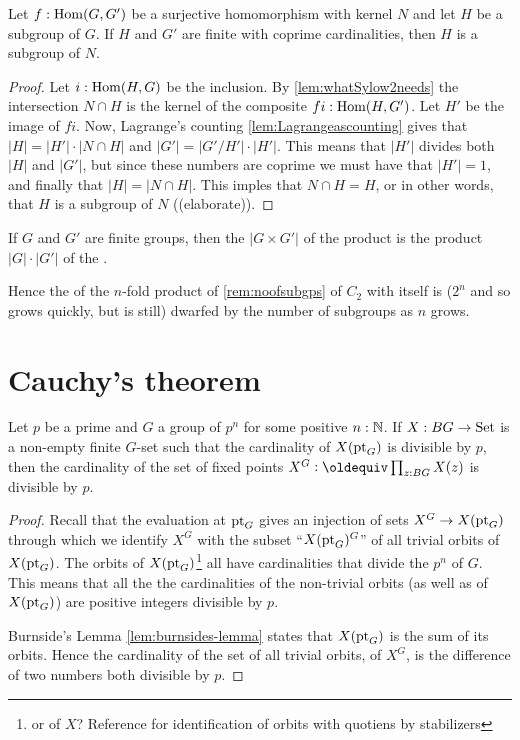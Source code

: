 \begin{corollary}
  \label{cor:whatSylow2needs}Let $f:\mathrm{Hom}(G,G')$ be a surjective homomorphism with kernel $N$ and let $H$ be a subgroup of $G$.  If $H$ and $G'$ are finite with coprime cardinalities, then $H$ is a subgroup of $N$.
\end{corollary}
\begin{proof}
  Let $i:\mathrm{Hom}(H,G)$ be the inclusion.  By \cref{lem:whatSylow2needs} the intersection $N\cap H$ is the kernel of the composite $fi:\mathrm{Hom}(H,G')$.  Let $H'$ be the image of $fi$. Now, Lagrange's counting \cref{lem:Lagrangeascounting} gives that $|H|=|H'|\cdot |N\cap H|$ and $|G'|=|G'/H'|\cdot|H'|$.  This means that $|H'|$ divides both $|H|$ and $|G'|$, but since these numbers are coprime we must have that $|H'|=1$, and finally that $|H|=|N\cap H|$.  This imples that $N\cap H=H$, or in other words, that $H$ is a subgroup of $N$ ((elaborate)).
\end{proof}

\begin{corollary}
  If $G$ and $G'$ are finite groups, then the \gporder $|G\times G'|$ of the product is the product $|G|\cdot| G'|$ of the \gporders.
\end{corollary}
\begin{remark}
  Hence the \gporder of the $n$-fold product of \cref{rem:noofsubgps} of $C_2$ with itself is ($2^n$ and so grows quickly, but is still) dwarfed by the number of subgroups as $n$ grows.
\end{remark}


\section{Cauchy's theorem}
\begin{lemma}
  \label{lem:fixedptsize}
  Let $p$ be a prime and $G$ a group of \gporder $p^n$ for some positive $n:\mathbb{N}$.  If $X:BG\to\mathord{\mathrm{Set}}$ is a non-empty finite $G$-set such that the cardinality of $X({\mathord{\mathrm{pt}}}_G)$ is divisible by $p$, then the cardinality of the set of fixed points $X^G\defequi\prod_{z:BG}X(z)$ is divisible by $p$.
\end{lemma}
\begin{proof}
  Recall that the evaluation at ${\mathord{\mathrm{pt}}}_G$ gives an injection of sets $X^G\to X({\mathord{\mathrm{pt}}}_G)$ through which we identify $X^G$ with the subset ``$X({\mathord{\mathrm{pt}}}_G)^G$'' of all trivial orbits of $X({\mathord{\mathrm{pt}}}_G)$.
 The orbits of $X({\mathord{\mathrm{pt}}}_G)$\footnote{or of $X$?  Reference for identification of orbits with quotiens by stabilizers} all have cardinalities that divide the \gporder $p^n$ of $G$.  
This means that all the the cardinalities of the non-trivial orbits (as well as of $X({\mathord{\mathrm{pt}}}_G)$) are positive integers divisible by $p$. 

 Burnside's Lemma \cref{lem:burnsides-lemma} states that $X({\mathord{\mathrm{pt}}}_G)$ is the sum of its orbits.
Hence the cardinality of the set of all trivial orbits, \ie of $X^G$, is the difference of two numbers both divisible by $p$.  
\end{proof}

